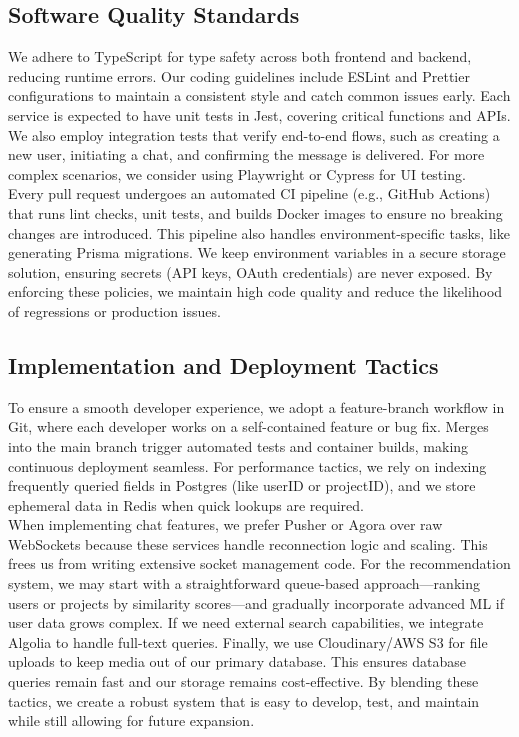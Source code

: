 \documentclass{FastFyp}
\begin{document}
\subsection{Software Quality Standards}
We adhere to TypeScript for type safety across both frontend and backend, reducing runtime errors. Our coding guidelines include ESLint and Prettier configurations to maintain a consistent style and catch common issues early. Each service is expected to have unit tests in Jest, covering critical functions and APIs. We also employ integration tests that verify end-to-end flows, such as creating a new user, initiating a chat, and confirming the message is delivered. For more complex scenarios, we consider using Playwright or Cypress for UI testing. \\
Every pull request undergoes an automated CI pipeline (e.g., GitHub Actions) that runs lint checks, unit tests, and builds Docker images to ensure no breaking changes are introduced. This pipeline also handles environment-specific tasks, like generating Prisma migrations. We keep environment variables in a secure storage solution, ensuring secrets (API keys, OAuth credentials) are never exposed. By enforcing these policies, we maintain high code quality and reduce the likelihood of regressions or production issues.

\subsection{Implementation and Deployment Tactics}
To ensure a smooth developer experience, we adopt a feature-branch workflow in Git, where each developer works on a self-contained feature or bug fix. Merges into the main branch trigger automated tests and container builds, making continuous deployment seamless. For performance tactics, we rely on indexing frequently queried fields in Postgres (like userID or projectID), and we store ephemeral data in Redis when quick lookups are required. \\
When implementing chat features, we prefer Pusher or Agora over raw WebSockets because these services handle reconnection logic and scaling. This frees us from writing extensive socket management code. For the recommendation system, we may start with a straightforward queue-based approach—ranking users or projects by similarity scores—and gradually incorporate advanced ML if user data grows complex. If we need external search capabilities, we integrate Algolia to handle full-text queries. Finally, we use Cloudinary/AWS S3 for file uploads to keep media out of our primary database. This ensures database queries remain fast and our storage remains cost-effective. By blending these tactics, we create a robust system that is easy to develop, test, and maintain while still allowing for future expansion.
\end{document}
